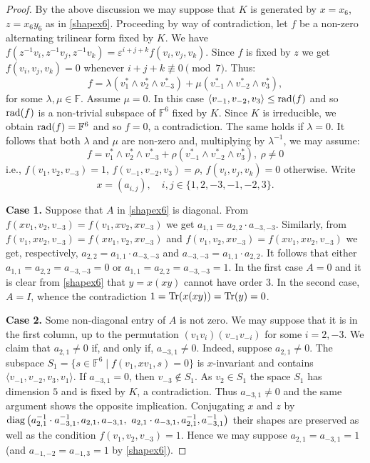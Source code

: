 \documentclass{amsart}
\theoremstyle{remark}
\begin{document}
\begin{proof}
By the above discussion we may suppose that $K$ is generated by $x=x_6$, $z=x_6y_6$ as in \eqref{shapex6}.
Proceeding by way of contradiction, let $f$ be a non-zero alternating trilinear form fixed  by $K$.
We have  $f(z^ {-1} v_i, z^{-1} v_j, z^ {-1} v_k)=
{\varepsilon}^ {i+j+k}f(v_i,v_j,v_k)$. Since $f$ is fixed by $z$  we get $f(v_i,v_j,v_k)=0$ whenever 
$i+j+k\not\equiv 0\pmod 7$. Thus:
$$f=\lambda (v_1^\ast \wedge v_2^\ast \wedge v_{-3}^ \ast)+\mu (v_{-1}^\ast \wedge v_{-2}^\ast \wedge v_{3}^ \ast),$$
for some $\lambda,\mu\in {\mathbb{F}}$. Assume $\mu =0$. In this case $\langle v_{-1},v_{-2},v_{3}\rangle\leq {\mathop{\rm rad}\nolimits }(f)$ and so
${\mathop{\rm rad}\nolimits }(f)$ is a non-trivial subspace of ${\mathbb{F}}^ 6$ fixed by $K$.
Since $K$ is irreducible, we obtain ${\mathop{\rm rad}\nolimits }(f) ={\mathbb{F}}^6$ and so $f=0$, a contradiction. The same holds if $\lambda=0$. 
It follows that both $\lambda$ and $\mu$ are non-zero and, multiplying by $\lambda^{-1}$, we may assume:
\begin{equation}\label{trilK}
f=v_1^\ast \wedge v_2^\ast \wedge v_{-3}^ \ast+\rho\left( v_{-1}^\ast \wedge v_{-2}^\ast \wedge v_{3}^ \ast\right),\ \rho\ne 0
\end{equation}
i.e., $f\left(v_{1},v_{2},v_{-3}\right)=1$, $f\left(v_{-1},v_{-2},v_{3}\right)=\rho$, 
$f\left(v_{i},v_{j},v_{k}\right)=0$ otherwise.
Write 
$$x=(a_{i,j}),\quad i,j\in\{1,2,-3,-1,-2,3\}.$$

\noindent \textbf{Case 1.} Suppose that $A$ in \eqref{shapex6} is diagonal.
From $f(x v_1, v_2,v_{-3} )=f(v_1, x v_2, x v_{-3})$ we get
$a_{1,1}=a_{2,2}\cdot a_{-3,-3}$. Similarly, from $f(v_1,  x v_2,  v_{-3})=
f(x v_1, v_2, x v_{-3})$ and 
$f(v_1,v_2, x v_{-3})=f( x v_1,  x v_{2}, v_{-3})$ we get, respectively, 
$a_{2,2}=a_{1,1}\cdot a_{-3,-3}$ and $a_{-3,-3}=a_{1,1}\cdot a_{2,2}$. It follows that either $a_{1,1}=a_{2,2}=a_{-3,-3}=0$ or $a_{1,1}=a_{2,2}=a_{-3,-3}=1$. 
In the first case  $A=0$ and it is clear from \eqref{shapex6} that $y=x(xy)$ cannot have order $3$. 
In the second case, $A=I$, whence the contradiction
$1={{\rm Tr}({x(xy)})}={{\rm Tr}({y})}=0$.
\medskip

\noindent\textbf{Case 2.} Some non-diagonal entry of $A$ is not zero. We may suppose that it is 
in the first column, up to the permutation $\left(v_{1}v_{i}\right)\left(v_{-1}v_{-i}\right)$ for some $i=2,-3$.
We claim that $a_{2,1} \ne 0$ if, and only if, $a_{-3,1}\ne 0$.
Indeed, suppose $a_{2,1} \ne 0$. The subspace $S_1=\{s\in {\mathbb{F}}^ 6\mid f(v_1, x v_1, s)=0\}$ is 
$x$-invariant and contains $\langle v_{-1},v_{-2},v_3,v_1\rangle$. 
If $a_{-3,1}=0$, then $v_{-3}\not\in S_1$. As $v_2 \in S_1$ the space
$S_1$ has dimension $5$ and is fixed by $K$, a contradiction. Thus $a_{-3,1}\ne 0$ and the same 
argument shows the opposite implication.  Conjugating $x$ and $z$ by 
${\mathop{\rm diag}\nolimits}\left(a_{2,1}^{-1}\cdot a_{-3,1}^{-1}, a_{2,1}, a_{-3,1}, \ a_{2,1}\cdot a_{-3,1}, a_{2,1}^{-1}, a_{-3,1}^{-1}\right)$
their shapes are preserved as well as the condition $f\left(v_1, v_2,v_{-3}\right)=1$.
Hence we may suppose
$a_{2,1}=a_{-3,1}=1$ (and $a_{-1,-2}=a_{-1,3}=1$ by \eqref{shapex6}). 


\end{proof}
\end{document}
